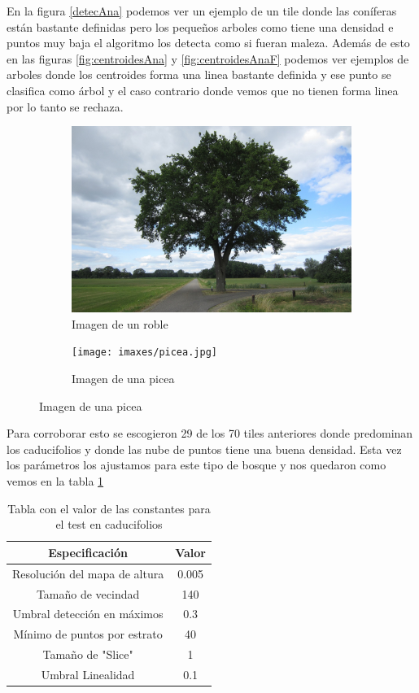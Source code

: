 En la figura \ref{detecAna} podemos ver un ejemplo de un tile donde las coníferas están bastante definidas pero los pequeños arboles como tiene una densidad e puntos muy baja el algoritmo los detecta como si fueran maleza. Además de esto en las figuras \ref{fig:centroidesAna} y \ref{fig:centroidesAnaF} podemos ver ejemplos de arboles donde los centroides forma una linea bastante definida y ese punto se clasifica como árbol y el caso contrario donde vemos que no tienen forma linea por lo tanto se rechaza.



\begin{figure}
  \begin{subfigure}{0.5\textwidth}
    \centering
    \includegraphics[width=0.8\linewidth]{imaxes/2019-07-03_Eik_in_Kerspel_Goor.jpg}
    \caption{Imagen de un roble}
  \end{subfigure}%
  \begin{subfigure}{0.5\textwidth}
    \centering
    \texttt{[image: imaxes/picea.jpg]}
    \caption{Imagen de una picea}
  \end{subfigure}
\end{figure}

Para corroborar esto se escogieron 29 de los 70 tiles anteriores donde predominan los caducifolios y donde las nube de puntos tiene una buena densidad. Esta vez los parámetros los ajustamos para este tipo de bosque y nos quedaron como vemos en la tabla \ref{tablavar2}

\begin{table}[h]
\centering
{}
\begin{tabular}{c|c}
\rowcolor{udcpink!25}
\textbf{Especificación} & \textbf{Valor} \\\hline


Resolución del mapa de altura & 0.005 \\
Tamaño de vecindad & 140 \\
Umbral detección en máximos & 0.3 \\
Mínimo de puntos por estrato & 40 \\
Tamaño de "Slice" & 1 \\
Umbral Linealidad & 0.1 \\

\end{tabular}
\caption{Tabla con el valor de las constantes para el test en caducifolios}
\label{tablavar2}
\end{table}


